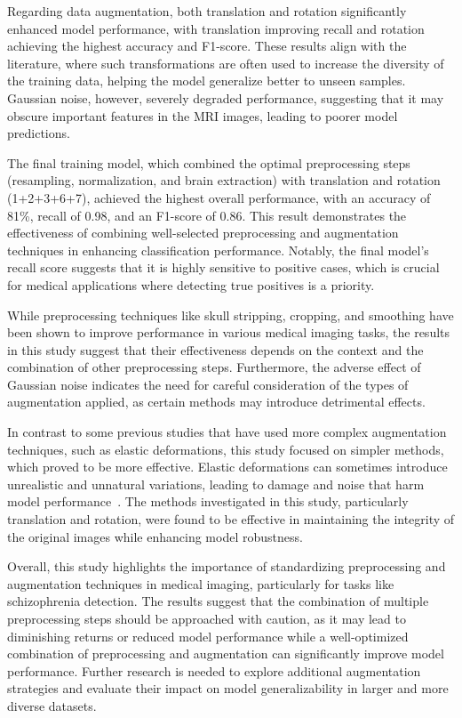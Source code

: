 Regarding data augmentation, both translation and rotation significantly enhanced model performance, with translation improving recall and rotation achieving the highest accuracy and F1-score. These results align with the literature, where such transformations are often used to increase the diversity of the training data, helping the model generalize better to unseen samples. Gaussian noise, however, severely degraded performance, suggesting that it may obscure important features in the MRI images, leading to poorer model predictions.

The final training model, which combined the optimal preprocessing steps (resampling, normalization, and brain extraction) with translation and rotation (1+2+3+6+7), achieved the highest overall performance, with an accuracy of 81\%, recall of 0.98, and an F1-score of 0.86. This result demonstrates the effectiveness of combining well-selected preprocessing and augmentation techniques in enhancing classification performance. Notably, the final model's recall score suggests that it is highly sensitive to positive cases, which is crucial for medical applications where detecting true positives is a priority.

While preprocessing techniques like skull stripping, cropping, and smoothing have been shown to improve performance in various medical imaging tasks, the results in this study suggest that their effectiveness depends on the context and the combination of other preprocessing steps. Furthermore, the adverse effect of Gaussian noise indicates the need for careful consideration of the types of augmentation applied, as certain methods may introduce detrimental effects.

In contrast to some previous studies that have used more complex augmentation techniques, such as elastic deformations, this study focused on simpler methods, which proved to be more effective. Elastic deformations can sometimes introduce unrealistic and unnatural variations, leading to damage and noise that harm model performance~\cite{Mok2018}. The methods investigated in this study, particularly translation and rotation, were found to be effective in maintaining the integrity of the original images while enhancing model robustness.

Overall, this study highlights the importance of standardizing preprocessing and augmentation techniques in medical imaging, particularly for tasks like schizophrenia detection. The results suggest that the combination of multiple preprocessing steps should be approached with caution, as it may lead to diminishing returns or reduced model performance while a well-optimized combination of preprocessing and augmentation can significantly improve model performance. Further research is needed to explore additional augmentation strategies and evaluate their impact on model generalizability in larger and more diverse datasets.

